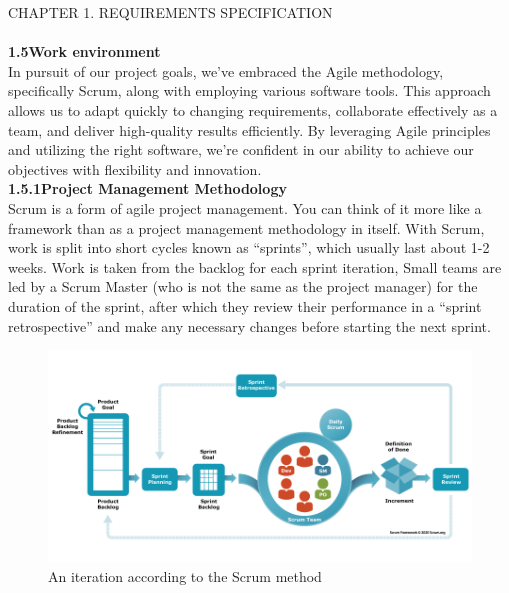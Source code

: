 \documentclass{article}
\begin{document}
\newpage
\noindent
CHAPTER 1.  REQUIREMENTS SPECIFICATION \\
\underline{\hspace{\textwidth}} \vspace{0.2cm}\\
{\Large \textbf{1.5\hspace{1em}Work environment}}\vspace{0.2cm}\\
In pursuit of our project goals, we've embraced the Agile methodology, specifically Scrum, along with employing various software tools. This approach allows us to adapt quickly to changing requirements, collaborate effectively as a team, and deliver high-quality results efficiently. By leveraging Agile principles and utilizing the right software, we're confident in our ability to achieve our objectives with flexibility and innovation.\vspace{0.2cm}\\
{\large \textbf{1.5.1\hspace{1em}Project Management Methodology}}
\\Scrum is a form of agile project management. You can think of it more like a framework than as a project management methodology in itself.
With Scrum, work is split into short cycles known as “sprints”, which usually last about 1-2 weeks. Work is taken from the backlog for each sprint iteration,
Small teams are led by a Scrum Master (who is not the same as the project manager) for the duration of the sprint, after which they review their performance in a “sprint retrospective” and make any necessary changes before starting the next sprint.
\\
\vspace{0.3cm}
\begin{figure}[htbp]
    \centering
    \includegraphics[width=1\textwidth]{1234}
    \caption{An iteration according to the Scrum method}
    \label{fig:design2}
\end{figure}
\end{document}
